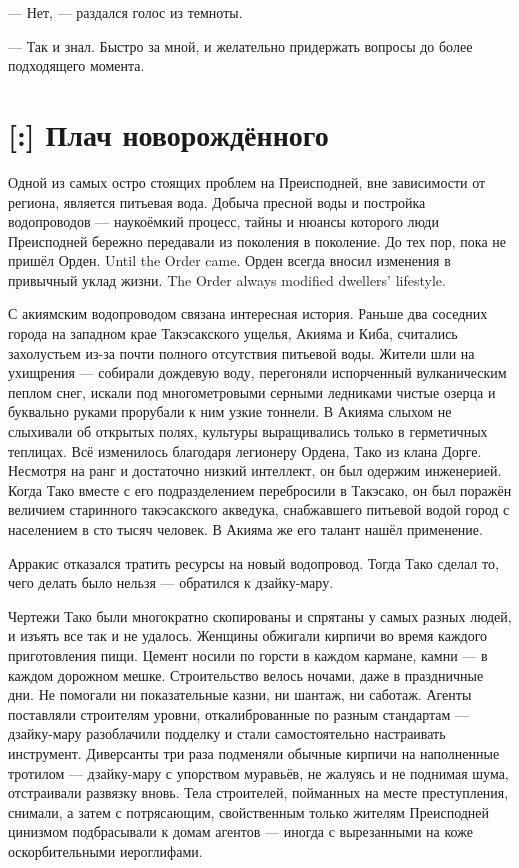 --- Нет, --- раздался голос из темноты.

--- Так и знал.
Быстро за мной, и желательно придержать вопросы до более подходящего момента.

\section{[:] Плач новорождённого}

Одной из самых остро стоящих проблем на Преисподней, вне зависимости от региона, является питьевая вода.
Добыча пресной воды и постройка водопроводов --- наукоёмкий процесс, тайны и нюансы которого люди Преисподней бережно передавали из поколения в поколение.
{До тех пор, пока не пришёл Орден.}
{Until the Order came.}
{Орден всегда вносил изменения в привычный уклад жизни.}
{The Order always modified dwellers' lifestyle.}

С акиямским водопроводом связана интересная история.
Раньше два соседних города на западном крае Такэсакского ущелья, Акияма и Киба, считались захолустьем из-за почти полного отсутствия питьевой воды.
Жители шли на ухищрения --- собирали дождевую воду, перегоняли испорченный вулканическим пеплом снег, искали под многометровыми серными ледниками чистые озерца и буквально руками прорубали к ним узкие тоннели.
В Акияма слыхом не слыхивали об открытых полях, культуры выращивались только в герметичных теплицах.
Всё изменилось благодаря легионеру Ордена, Тако из клана Дорге.
Несмотря на ранг и достаточно низкий интеллект, он был одержим инженерией.
Когда Тако вместе с его подразделением перебросили в Такэсако, он был поражён величием старинного такэсакского акведука, снабжавшего питьевой водой город с населением в сто тысяч человек.
В Акияма же его талант нашёл применение.

Арракис отказался тратить ресурсы на новый водопровод.
Тогда Тако сделал то, чего делать было нельзя --- обратился к дзайку-мару.

Чертежи Тако были многократно скопированы и спрятаны у самых разных людей, и изъять все так и не удалось.
Женщины обжигали кирпичи во время каждого приготовления пищи.
Цемент носили по горсти в каждом кармане, камни --- в каждом дорожном мешке.
Строительство велось ночами, даже в праздничные дни.
Не помогали ни показательные казни, ни шантаж, ни саботаж.
Агенты поставляли строителям уровни, откалиброванные по разным стандартам --- дзайку-мару разоблачили подделку и стали самостоятельно настраивать инструмент.
Диверсанты три раза подменяли обычные кирпичи на наполненные тротилом --- дзайку-мару с упорством муравьёв, не жалуясь и не поднимая шума, отстраивали развязку вновь.
Тела строителей, пойманных на месте преступления, снимали, а затем с потрясающим, свойственным только жителям Преисподней цинизмом подбрасывали к домам агентов --- иногда с вырезанными на коже оскорбительными иероглифами.

